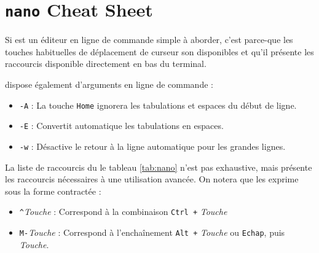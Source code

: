 \section{\texttt{nano} Cheat Sheet} \label{appendix:nano} 
\vspace{-7mm}
Si  est un éditeur en ligne de commande simple à aborder, c'est parce-que les touches habituelles de déplacement de curseur son disponibles et qu'il présente les raccourcis disponible directement en bas du terminal.

 dispose également d'arguments en ligne de commande :
\begin{itemize}
    \item \texttt{-A} : La touche \texttt{Home} ignorera les tabulations et espaces du début de ligne.
    \item \texttt{-E} : Convertit automatique les tabulations en espaces.
    \item \texttt{-w} : Désactive le retour à la ligne automatique pour les grandes lignes.
\end{itemize}
\vspace{2mm}
La liste de raccourcis du le tableau \ref{tab:nano} n'est pas exhaustive, mais présente les raccourcis nécessaires à une utilisation avancée. On notera que  les exprime sous la forme contractée : 
\begin{itemize}
    \item \texttt{\^}\textit{Touche} : Correspond à la combinaison \texttt{Ctrl +} \textit{Touche}
    \item \texttt{M-}\textit{Touche} : Correspond à l'enchaînement \texttt{Alt +} \textit{Touche} ou \texttt{Echap}, puis \textit{Touche}.
\end{itemize}

